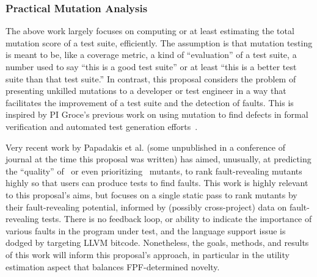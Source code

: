 \subsubsection{Practical Mutation Analysis}

The above work largely focuses on computing or at least estimating the
total mutation score of a
test suite, efficiently.  The assumption is that mutation testing is
meant to be, like a coverage metric, a kind of ``evaluation'' of a
test suite, a number used to say ``this is a good test suite'' or at
least ``this is a better test suite than that test suite.''  In contrast,
this proposal considers the problem of presenting unkilled mutations to
a developer or test engineer in a way that facilitates the improvement
of a test suite and the detection of faults.  This is inspired by PI Groce's
previous work on using mutation to find defects in formal verification
and automated test generation
efforts~\cite{groce2015verified,groce2018verified,mutKernel}.

Very recent work by Papadakis et al. (some unpublished in a conference
of journal at the time this proposal was written) has 
aimed, unusually, at predicting the ``quality'' of~\cite{MutQuality}
or even prioritizing~\cite{FaRM} mutants, to rank fault-revealing
mutants highly so that users can produce tests to find faults.  This
work is highly relevant to this proposal's aims, but focuses on a single static
pass to rank mutants by their fault-revealing potential, informed by
(possibly cross-project)
data on fault-revealing tests.  There is no feedback loop, or ability
to indicate the importance of various faults in the program under
test, and the language support issue is dodged by targeting LLVM
bitcode.  Nonetheless, the goals, methods, and results of this work
will inform this proposal's approach, in particular in the utility estimation
aspect that balances FPF-determined novelty.

